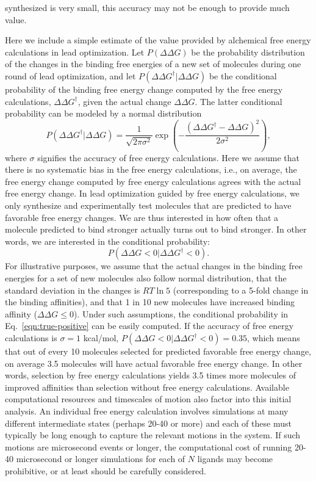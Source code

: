 \documentclass[9pt,bestpractices]{livecoms}
\begin{document}
synthesized is very small, this accuracy may not be enough to provide
much value.

Here we include a simple estimate of the value provided by alchemical
free energy calculations in lead optimization.  Let $P(\Delta\Delta
G)$ be the probability distribution of the changes in the binding free
energies of a new set of molecules during one round of lead
optimization, and let $P(\Delta\Delta G^\dagger|\Delta\Delta G)$ be the
conditional probability of the binding free energy change computed by
the free energy calculations, $\Delta\Delta G^\dagger$, given the actual
change $\Delta\Delta G$.  The latter conditional probability can be modeled
by a normal distribution
\begin{equation}
  P(\Delta\Delta G^\dagger|\Delta\Delta G) = \frac{1}{\sqrt{2\pi\sigma^2}}
  \exp\left(-\frac{(\Delta\Delta G^\dagger - \Delta\Delta G)^2}{2\sigma^2}\right),
  \label{eqn:free-energy-distribution}
\end{equation}
where $\sigma$ signifies the accuracy of free energy calculations.
Here we assume that there is no systematic bias in the free energy
calculations, i.e., on average, the free energy change computed by
free energy calculations agrees with the actual free energy change.
%
In lead optimization guided by free energy calculations, we only
synthesize and experimentally test molecules that are predicted to
have favorable free energy changes.  We are thus interested in how
often that a molecule predicted to bind stronger actually turns out to
bind stronger.  In other words, we are interested in the conditional
probability:
\begin{equation}
  P(\Delta\Delta G<0|\Delta\Delta G^\dagger<0).
  \label{eqn:true-positive}
\end{equation}
%
For illustrative purposes, we assume that the actual changes in the
binding free energies for a set of new molecules also follow normal
distribution, that the standard deviation in the changes is $RT\ln 5$
(corresponding to a 5-fold change in the binding affinities), and that
1 in 10 new molecules have increased binding affinity ($\Delta\Delta G
\leq 0$).  Under such assumptions, the conditional probability in
Eq.~\ref{eqn:true-positive} can be easily computed.  If the accuracy
of free energy calculations is $\sigma = 1$ kcal/mol, $P(\Delta\Delta
G<0|\Delta\Delta G^\dagger<0) = 0.35$, which means that out of every
10 molecules selected for predicted favorable free energy change, on
average 3.5 molecules will have actual favorable free energy change.
In other words, selection by free energy calculations yields 3.5 times
more molecules of improved affinities than selection without free
energy calculations.
%  
Available computational resources and timescales of motion also factor
into this initial analysis. An individual free energy calculation
involves simulations at many different intermediate states (perhaps
20-40 or more) and each of these must typically be long enough to
capture the relevant motions in the system. If such motions are
microsecond events or longer, the computational cost of running 20-40
microsecond or longer simulations for each of $N$ ligands may become
prohibitive, or at least should be carefully considered. 
%
\end{document}
